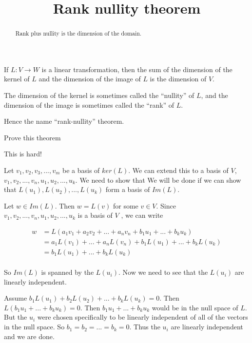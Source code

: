 \documentclass{ximera}
\title{Rank nullity theorem}
\begin{document}
\begin{abstract}
	Rank plus nullity is the dimension of the domain.
\end{abstract}


\begin{theorem}
	If $L:V \to W$ is a linear transformation, then the sum of the dimension of the kernel of $L$ and the dimension of the image of $L$ is the dimension of $V$.
 \end{theorem}
 
 The dimension of the kernel is sometimes called the ``nullity'' of
 $L$, and the dimension of the image is sometimes called the ``rank''
 of $L$.

Hence the name ``rank-nullity'' theorem.
 
 Prove this theorem
 
 \begin{warning}
 This is hard!
 \end{warning}
 
 \begin{free-response}
 	Let $v_1,v_2,v_3,...,v_m$ be a basis of $ker(L)$.  We can extend this to a basis of $V$, $v_1,v_2,...,v_n,u_1,u_2,...,u_k$.  We need to show that 
 	We will be done if we can show that $L(u_1),L(u_2),...,L(u_k)$ form a basis of $Im(L)$.
 	
 	Let $w \in Im(L)$.  Then $w = L(v)$ for some $v \in V$.  Since $v_1,v_2,...,v_n,u_1,u_2,...,u_k$ is a basis of $V$ , we can write
 	
 	\begin{align*}
 		w &= L( a_1v_1+a_2v_2+...+a_nv_n+b_1u_1+...+b_ku_k)\\
 			&=a_1L(v_1)+...+a_nL(v_n)+b_1L(u_1)+...+b_kL(u_k)\\
 			&=b_1L(u_1)+...+b_kL(u_k)\\
 	\end{align*}
 	
 	So $Im(L)$ is spanned by the $L(u_i)$.  Now we need to see that the $L(u_i)$ are linearly independent.
 	
 	Assume $b_1L(u_1)+b_2L(u_2)+...+b_kL(u_k) = 0$.  Then $L(b_1u_1+...+b_ku_k) = 0$.  Then $b_1u_1+...+b_ku_k$ would be in the null space of $L$.  But
 	the $u_i$ were chosen specifically to be linearly independent of all of the vectors in the null space.  So $b_1=b_2=...=b_k = 0$.   Thus the $u_i$ are linearly independent
 	and we are done.
 \end{free-response}
\end{document}
